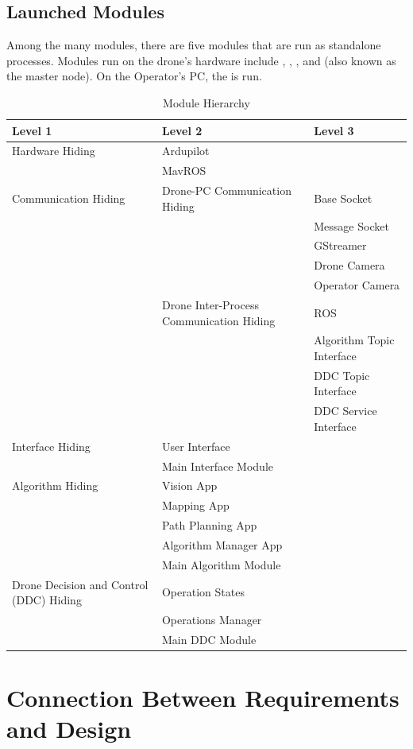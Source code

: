 \documentclass[12pt, titlepage]{article}
\begin{document}
\subsection{Launched Modules}
Among the many modules, there are five modules that are run as standalone processes. Modules run on the drone's hardware include , , , and  (also known as the master node). On the Operator's PC, the  is run.


\begin{table}[h!]
\centering
\begin{tabular}{p{} p{}  p{}}
\toprule
\textbf{Level 1} & \textbf{Level 2} & 
\textbf{Level 3}\\
\midrule
{Hardware Hiding} & 
Ardupilot \\
& MavROS \\
\midrule
Communication Hiding &
Drone-PC Communication Hiding & Base Socket \\
 && Message Socket \\
 && GStreamer \\
 && Drone Camera \\
 && Operator Camera \\
 &{Drone Inter-Process Communication Hiding} 
& ROS \\
&& Algorithm Topic Interface \\
&& DDC Topic Interface \\
&& DDC Service Interface \\
\midrule
Interface Hiding
& User Interface \\
& Main Interface Module \\
\midrule
{Algorithm Hiding} 
& Vision App \\
& Mapping App \\
& Path Planning App \\
& Algorithm Manager App \\
& Main Algorithm Module \\
\midrule
{Drone Decision and Control (DDC) Hiding} 
& Operation States \\
& Operations Manager \\
& Main DDC Module \\
\midrule
\end{tabular}
\caption{Module Hierarchy}
\label{TblMH}
\end{table}

\section{Connection Between Requirements and Design} \label{SecConnection}
\end{document}
